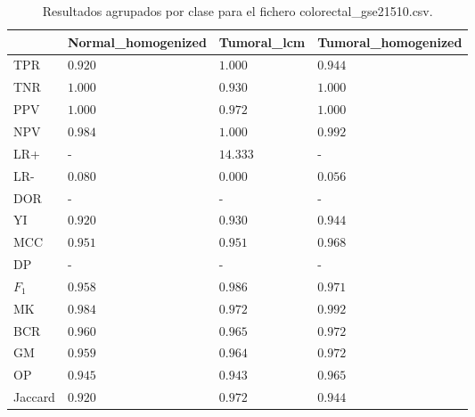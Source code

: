 \begin{table}[htp]
    \small
    \centering
    \begin{tabularx}{\columnwidth}{l Y Y Y}
                &  Normal\_homogenized  & Tumoral\_lcm  & Tumoral\_homogenized  \\\hline
        TPR     &  $0.920$              & $1.000$       & $0.944$               \\\hline
        TNR     &  $1.000$              & $0.930$       & $1.000$               \\\hline
        PPV     &  $1.000$              & $0.972$       & $1.000$               \\\hline
        NPV     &  $0.984$              & $1.000$       & $0.992$               \\\hline
        LR+     &  -                    & $14.333$      & -                     \\\hline
        LR-     &  $0.080$              & $0.000$       & $0.056$               \\\hline
        DOR     &  -                    & -             & -                     \\\hline
        YI      &  $0.920$              & $0.930$       & $0.944$               \\\hline
        MCC     &  $0.951$              & $0.951$       & $0.968$               \\\hline
        DP      &  -                    & -             & -                     \\\hline
        $F_{1}$ &  $0.958$              & $0.986$       & $0.971$               \\\hline
        MK      &  $0.984$              & $0.972$       & $0.992$               \\\hline
        BCR     &  $0.960$              & $0.965$       & $0.972$               \\\hline
        GM      &  $0.959$              & $0.964$       & $0.972$               \\\hline
        OP      &  $0.945$              & $0.943$       & $0.965$               \\\hline
        Jaccard &  $0.920$              & $0.972$       & $0.944$               \\\hline
    \end{tabularx}
    \caption{Resultados agrupados por clase para el fichero colorectal\_gse21510.csv.}
    \label{tab:15}
\end{table}


